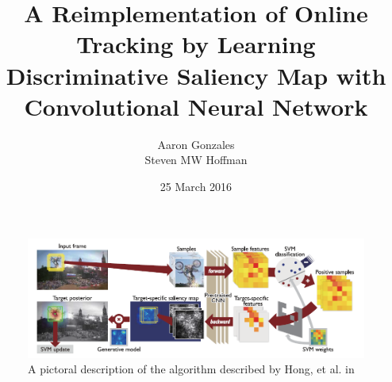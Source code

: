 \documentclass{sig-alternate-05-2015}
\begin{document}


\title{A Reimplementation of Online Tracking by Learning Discriminative Saliency Map with Convolutional Neural Network}

\author{
%
%
\alignauthor
Aaron Gonzales\\
\alignauthor
Steven MW Hoffman \\
}
\date{25 March 2016}

\maketitle

\begin{figure}[t]
\centering
\includegraphics[width=\textwidth]{algorithm}
\caption{A pictoral description of the algorithm described by Hong, et al. in \cite{hong2015online}}
\label{fig:algor}
\end{figure}
\end{document}
